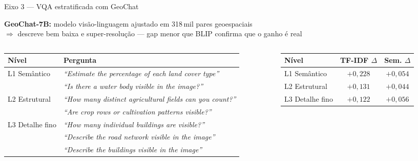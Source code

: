 \documentclass[aspectratio=169]{beamer}
\begin{document}
\begin{frame}{Eixo 3 — VQA estratificada com GeoChat}

  \textbf{GeoChat-7B:} modelo visão-linguagem ajustado em 318\,mil pares geoespaciais\\
  $\Rightarrow$ descreve bem baixa e super-resolução --- gap menor que BLIP confirma que o ganho é real

  \vspace{0.3em}
  \begin{columns}[T]
    \begin{column}{0.57\textwidth}
      \fontsize{7.2pt}{9pt}\selectfont
      \begin{tabular}{@{}lp{5.0cm}@{}}
        \toprule
        \textbf{Nível} & \textbf{Pergunta} \\
        \midrule
        \multirow{2}{*}{L1 Semântico}
          & \textit{``Estimate the percentage of each land cover type''} \\[2pt]
          & \textit{``Is there a water body visible in the image?''} \\
        \midrule
        \multirow{2}{*}{L2 Estrutural}
          & \textit{``How many distinct agricultural fields can you count?''} \\[2pt]
          & \textit{``Are crop rows or cultivation patterns visible?''} \\
        \midrule
        \multirow{3}{*}{L3 Detalhe fino}
          & \textit{``How many individual buildings are visible?''} \\[2pt]
          & \textit{``Describe the road network visible in the image''} \\[2pt]
          & \textit{``Describe the buildings visible in the image''} \\
        \bottomrule
      \end{tabular}
    \end{column}
    \begin{column}{0.40\textwidth}
      \fontsize{8pt}{10pt}\selectfont
      \begin{tabular}{@{}lcc@{}}
        \toprule
        \textbf{Nível} & \textbf{TF-IDF $\Delta$} & \textbf{Sem. $\Delta$} \\
        \midrule
        L1 Semântico    & $+0{,}228$ & $+0{,}054$ \\
        L2 Estrutural   & $+0{,}131$ & $+0{,}044$ \\
        L3 Detalhe fino & $+0{,}122$ & $+0{,}056$ \\

\end{tabular}
\end{column}
\end{columns}
\end{frame}
\end{document}
